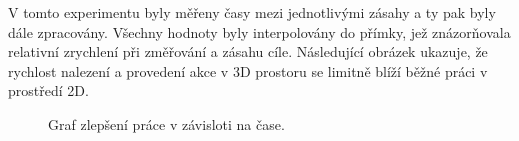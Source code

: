 V tomto experimentu byly měřeny časy mezi jednotlivými zásahy a ty pak byly dále zpracovány. Všechny hodnoty byly interpolovány do přímky, jež znázorňovala relativní zrychlení při změřování a zásahu cíle. Následující obrázek ukazuje, že rychlost nalezení a provedení akce v 3D prostoru se limitně blíží běžné práci v prostředí 2D.

\begin{figure}[htb]
\centering
{}
\caption{Graf zlepšení práce v závisloti na čase.}
\label{graf}
\end{figure}

